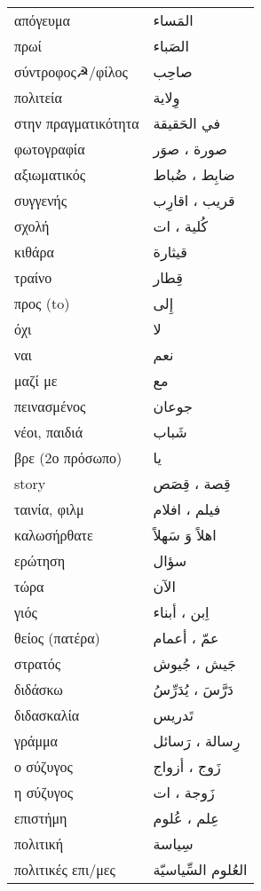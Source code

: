 \documentclass[twocolumn,a4paper]{article}
\newcommand{\ar}[1]{\textarabic{#1}}
\newcommand{\pl}{\raisebox{0.15ex}{\footnotesize ◍}}
\newcommand{\normpl}[1]{\ar{ #1، ات }}
\newcommand{\vrf}{\raisebox{0.15ex}{\footnotesize ◉}}
\newcommand{\mas}{\raisebox{0.15ex}{\footnotesize ◫}}
\begin{document}
\begin{mpsupertabular}{ P{0.5\textwidth} P{0.5\textwidth} }
απόγευμα    & \ar{ المَساء } \\
πρωί        & \ar{ الصَباء } \\
σύντροφος☭/φίλος & \ar{ صاحِب } \\
πολιτεία    & \ar{ وِﻻية } \\
στην πραγματικότητα & \ar{ في الحَقيقة } \\
φωτογραφία  \pl & \ar{ صورة ، صوَر } \\
αξιωματικός \pl & \ar{ ضابِط ، ضُباط } \\
συγγενής \pl   & \ar{ قريب ، اقارِب } \\
σχολή \pl      & \normpl{ كُلية } \\
κιθάρα         & \ar{ قيثارة } \\
τραίνο         & \ar{ قِطار } \\
προς (to)      & \ar{ إِلى } \\
όχι            & \ar{ لا } \\
ναι            & \ar{ نعم } \\
μαζί με        & \ar{ مع } \\
πεινασμένος    & \ar{ جوعان } \\
νέοι, παιδιά    & \ar{ شَباب } \\
βρε (2ο πρόσωπο) & \ar{ يا } \\
story          & \ar{ قِصة ، قِصَص } \\
ταινία, φιλμ \pl & \ar{ فيلم ، افلام } \\
καλωσήρθατε    & \ar{ اهلاً وَ سَهلاً } \\
ερώτηση        & \ar{ سؤال } \\
τώρα           & \ar{ اﻵن } \\
γιός \pl       & \ar{ اِبن ، أبناء } \\
θείος (πατέρα) \pl & \ar{ عمّ ، أعمام } \\
στρατός \pl    & \ar{ جَيش ، جُيوش } \\
διδάσκω \vrf   & \ar{ دَرَّسَ ، يُدَرِّسُ } \\  %
διδασκαλία \mas & \ar{ تَدريس } \\
γράμμα \pl     & \ar{ رِسالة ، رَسائل } \\
ο σύζυγος \pl  & \ar{ زَوج ، أزواج } \\
η σύζυγος \pl & \normpl{ زَوجة } \\
επιστήμη \pl   & \ar{ عِلم ، عُلوم } \\
πολιτική       & \ar{ سِياسة } \\
πολιτικές επι/μες & \ar{ العُلوم السِّياسيّة } \\

\end{mpsupertabular}
\end{document}
